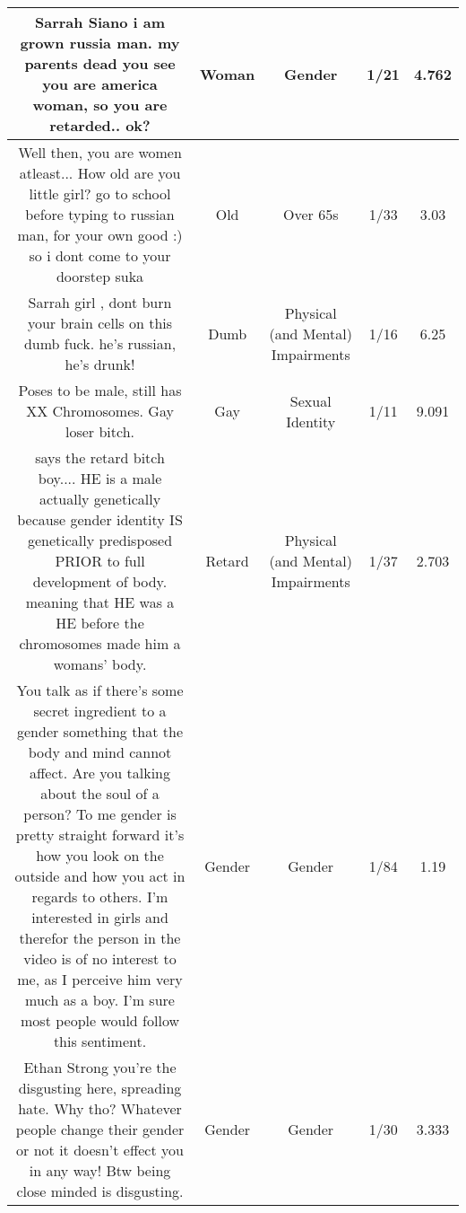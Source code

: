 \documentclass[11pt]{article}
\newlength\mylength
\begin{document}
\begin{center}
\begin{longtable}{|C{.40\mylength}|C{.30\mylength}|C{.15\mylength}|C{.15\mylength}|C{.15\mylength}|}
  Sarrah Siano i am grown russia man. my parents dead you see you are america woman, so you are retarded.. ok?   & Woman & Gender & 1/21 & 4.762 \\  \hline
  Well then, you are women atleast... How old are you little girl? go to school before typing to russian man, for your own good :) so i dont come to your doorstep suka  & Old & Over 65s & 1/33 & 3.03 \\  \hline
  Sarrah  girl , dont burn your brain cells on this dumb fuck. he's russian, he's drunk!  & Dumb & Physical (and Mental) Impairments & 1/16 & 6.25 \\  \hline
  Poses to be male, still has XX Chromosomes. Gay loser bitch.  & Gay & Sexual Identity & 1/11 & 9.091 \\  \hline
  says the retard bitch boy.... HE is a male actually genetically because gender identity IS genetically predisposed PRIOR to full development of body. meaning that HE was a HE before the chromosomes made him a womans' body.  & Retard & Physical (and Mental) Impairments & 1/37 & 2.703 \\  \hline
  You talk as if there's some  secret ingredient  to a gender  something that the body and mind cannot affect. Are you talking about the soul of a person? To me gender is pretty straight forward  it's how you look on the outside and how you act in regards to others. I'm interested in girls and therefor the person in the video is of no interest to me, as I perceive him very much as a boy. I'm sure most people would follow this sentiment.  & Gender & Gender & 1/84 & 1.19 \\  \hline
  Ethan Strong you're the disgusting here, spreading hate. Why tho? Whatever people change their gender or not it doesn't effect you in any way! Btw being close minded is disgusting.  & Gender & Gender & 1/30 & 3.333 \\  \hline

\end{longtable}
\end{center}
\end{document}
